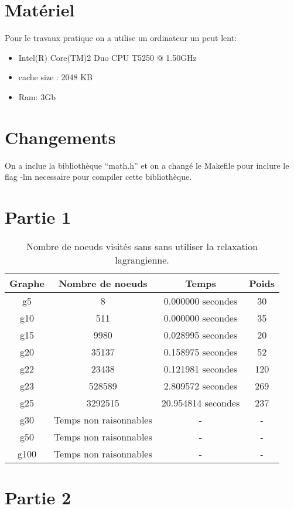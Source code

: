\documentclass[a4paper,11pt]{article}
\begin{document}
\titleTMB 
\newpage

\section*{Matériel}
Pour le travaux pratique on a utilise un ordinateur un peut lent:
\begin{itemize}
\item Intel(R) Core(TM)2 Duo CPU T5250 @ 1.50GHz
\item cache size : 2048 KB
\item Ram: 3Gb
\end{itemize}

\section*{Changements}
On a inclue  la bibliothèque ``math.h'' et on a changé  le Makefile pour inclure
le flag -lm necessaire pour compiler cette bibliothèque.

\section*{Partie 1}

\begin{table}[h!]

\caption{Nombre de noeuds visités sans sans utiliser la relaxation lagrangienne. }
\begin{centering}
\begin{tabular}{|c|c|c|c|}
\hline 
Graphe & Nombre de noeuds & Temps & Poids\tabularnewline
\hline 
\hline 
g5 & 8 & 0.000000 secondes  & 30\tabularnewline
\hline 
g10 & 511 & 0.000000 secondes  & 35\tabularnewline
\hline 
g15 & 9980 & 0.028995 secondes  & 20\tabularnewline
\hline 
g20 & 35137 & 0.158975 secondes  & 52\tabularnewline
\hline 
g22 & 23438 & 0.121981 secondes  & 120\tabularnewline
\hline 
g23 & 528589 & 2.809572 secondes & 269\tabularnewline
\hline 
g25 & 3292515 & 20.954814 secondes & 237\tabularnewline
\hline 
g30 & Temps non raisonnables & - & -\tabularnewline
\hline 
g50 & Temps non raisonnables & - & -\tabularnewline
\hline 
g100 & Temps non raisonnables & - & -\tabularnewline
\hline 
\end{tabular}
\par\end{centering}

\end{table}


\section*{Partie 2}
\end{document}
